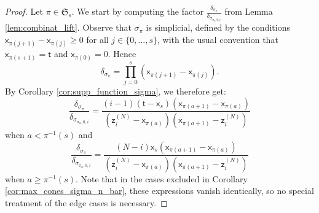 \documentclass[11pt]{article}
\theoremstyle{definition}
\begin{document}
\begin{proof}
	Let $\pi\in \mathfrak S_s$. We start by computing the factor $\frac{\delta_{\sigma_{\pi}}}{\delta_{\sigma_{\pi_a,0,i}}}$
	from Lemma \ref{lem:combinat_lift}. Observe that $\sigma_{\pi}$ is simplicial, defined by the conditions
	$\mathsf{x}_{\pi(j+1)}-\mathsf{x}_{\pi(j)}\ge 0$ for all $j\in \{0,\dots,s\}$, with the usual convention that $\mathsf{x}_{\pi(s+1)}=\mathsf{t}$
	and $\mathsf{x}_{\pi(0)}=0$. Hence
	$$\delta_{\sigma_{\pi}}=\prod_{j=0}^{s}(\mathsf{x}_{\pi(j+1)}-\mathsf{x}_{\pi(j)}).$$
	By Corollary \ref{cor:supp_function_sigma}, we therefore get:
	$$\frac{\delta_{\sigma_{\pi}}}{\delta_{\sigma_{\pi_a,0,i}}}=\frac{(i-1)(\mathsf{t}-\mathsf{x}_s)(\mathsf{x}_{\pi(a+1)}-\mathsf{x}_{\pi(a)})}{(\mathsf{z}_i^{(N)}-\mathsf{x}_{\pi(a)})(\mathsf{x}_{\pi(a+1)}-\mathsf{z}_i^{(N)})}$$
	when $a<\pi^{-1}(s)$ and
	$$\frac{\delta_{\sigma_{\pi}}}{\delta_{\sigma_{\pi_a,0,i}}}=\frac{(N-i)\mathsf{x}_s(\mathsf{x}_{\pi(a+1)}-\mathsf{x}_{\pi(a)})}{(\mathsf{z}_i^{(N)}-\mathsf{x}_{\pi(a)})(\mathsf{x}_{\pi(a+1)}-\mathsf{z}_i^{(N)})}$$
	when $a\ge \pi^{-1}(s)$. Note that in the cases excluded in Corollary \ref{cor:max_cones_sigma_n_bar}, these
	expressions vanish identically, so no special treatment of the edge cases is necessary.


\end{proof}
\end{document}
